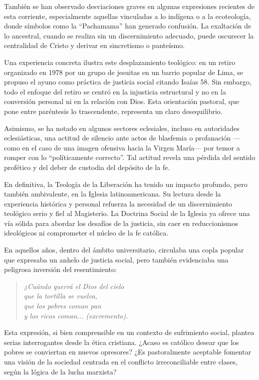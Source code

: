 \documentclass[12pt]{article}
\begin{document}
También se han observado desviaciones graves en algunas expresiones recientes de esta corriente, especialmente aquellas vinculadas a lo indígena o a la ecoteología, donde símbolos como la “Pachamama” han generado confusión. La exaltación de lo ancestral, cuando se realiza sin un discernimiento adecuado, puede oscurecer la centralidad de Cristo y derivar en sincretismo o panteísmo.

Una experiencia concreta ilustra este desplazamiento teológico: en un retiro organizado en 1978 por un grupo de jesuitas en un barrio popular de Lima, se propuso el ayuno como práctica de justicia social citando Isaías 58. Sin embargo, todo el enfoque del retiro se centró en la injusticia estructural y no en la conversión personal ni en la relación con Dios. Esta orientación pastoral, que pone entre paréntesis lo trascendente, representa un claro desequilibrio.

Asimismo, se ha notado en algunos sectores eclesiales, incluso en autoridades eclesiásticas, una actitud de silencio ante actos de blasfemia o profanación —como en el caso de una imagen ofensiva hacia la Virgen María— por temor a romper con lo “políticamente correcto”. Tal actitud revela una pérdida del sentido profético y del deber de custodia del depósito de la fe.

En definitiva, la Teología de la Liberación ha tenido un impacto profundo, pero también ambivalente, en la Iglesia latinoamericana. Su lectura desde la experiencia histórica y personal refuerza la necesidad de un discernimiento teológico serio y fiel al Magisterio. La Doctrina Social de la Iglesia ya ofrece una vía sólida para abordar los desafíos de la justicia, sin caer en reduccionismos ideológicos ni comprometer el núcleo de la fe católica.

En aquellos años, dentro del ámbito universitario, circulaba una copla popular que expresaba un anhelo de justicia social, pero también evidenciaba una peligrosa inversión del resentimiento:

\begin{quote}
\textit{¿Cuándo querrá el Dios del cielo\\
que la tortilla se vuelva,\\
que los pobres coman pan\\
y los ricos coman... (excremento).}
\end{quote}

Esta expresión, si bien comprensible en un contexto de sufrimiento social, plantea serias interrogantes desde la ética cristiana. ¿Acaso es católico desear que los pobres se conviertan en nuevos opresores? ¿Es pastoralmente aceptable fomentar una visión de la sociedad centrada en el conflicto irreconciliable entre clases, según la lógica de la lucha marxista?
\end{document}
